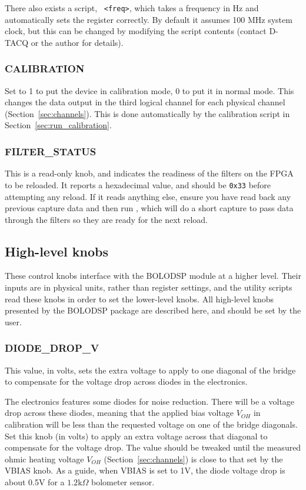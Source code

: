 \documentclass[12pt,a4paper]{article}
\begin{document}
There also exists a script, \mbox{~\texttt{<freq>}}, which takes a frequency in Hz and automatically sets the register
correctly. By default it assumes 100 MHz system clock, but this can be changed by modifying the script contents (contact D-TACQ or the author for
details).

\subsubsection{CALIBRATION}
Set to 1 to put the device in calibration mode, 0 to put it in normal mode. This changes the data output in the third logical channel for each physical
channel (Section~\ref{sec:channels}). This is done automatically by the calibration script in Section~\ref{sec:run_calibration}.

\subsubsection{FILTER{\_}STATUS}
This is a read-only knob, and indicates the readiness of the filters on the FPGA to be reloaded. It reports a hexadecimal value, and should be
\texttt{0x33} before attempting any reload. If it reads anything else, ensure you have read back any previous capture data and then run
\mbox{}, which will do a short capture to pass data through the filters so they are ready for the next reload.

\subsection{High-level knobs}
\label{sec:knobshl}
These control knobs interface with the BOLODSP module at a higher level. Their inputs are in physical units, rather than register settings, and the
utility scripts read these knobs in order to set the lower-level knobs. All high-level knobs presented by the BOLODSP package are described here, and
should be set by the user.

\subsubsection{DIODE{\_}DROP{\_}V}
This value, in volts, sets the extra voltage to apply to one diagonal of the bridge to compensate for the voltage drop across diodes in the electronics.

The electronics features some diodes for noise reduction. There will be a voltage drop across these diodes, meaning that the applied bias voltage $V_{OH}$
in calibration will be less than the requested voltage on one of the bridge diagonals. Set this knob (in volts) to apply an extra voltage across that
diagonal to compensate for the voltage drop. The value should be tweaked until the measured ohmic heating voltage $V_{OH}$ (Section~\ref{sec:channels}) is
close to that set by the VBIAS knob. As a guide, when VBIAS is set to 1V, the diode voltage drop is about 0.5V for a $1.2\mathrm{k}\Omega$ bolometer
sensor.
\end{document}

